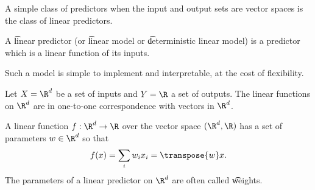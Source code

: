 

A simple class of predictors when the input and output sets are vector spaces is the class of linear predictors.

%
%
%

A \t{linear predictor} (or \t{linear model} or \t{deterministic linear model}) is a predictor which is a linear function of its inputs.


Such a model is simple to implement and interpretable, at the cost of flexibility.


Let $X = \R^d$ be a set of inputs and $Y = \R$ a set of outputs.
The linear functions on $\R^d$ are in one-to-one correspondence with vectors in $\R^d$.


A linear function $f: \R^d \to \R$ over the vector space $(\R^d, \R)$ has a set of parameters $w \in \R^d$ so that \[
  f(x) = \sum_{i} w_ix_i = \transpose{w}x.
\]
The parameters of a linear predictor on $\R^d$ are often called \t{weights}.

\blankpage
